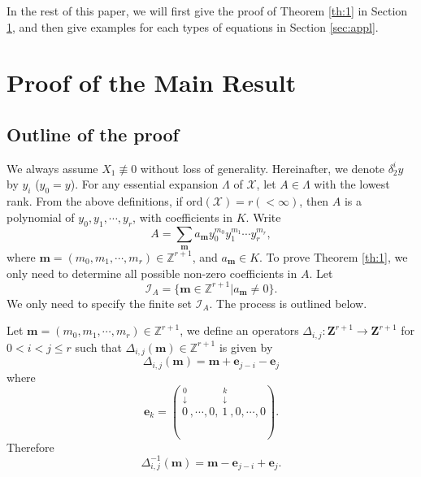 \documentclass[preprint,12pt]{elsarticle}
\begin{document}
In the rest of this paper, we will first give the proof of Theorem \ref{th:1} in Section \ref{sec:proof}, and then give examples for each types of equations in Section \ref{sec:appl}.

\section{Proof of  the Main Result}
\label{sec:proof}
\subsection{Outline of the proof}

We always assume $X_1 \not\equiv 0$ without loss of generality.  Hereinafter, we denote $\delta_2^i y$ by $y_i$ ($y_0 = y$). For any essential expansion $\Lambda$ of $\mathscr{X}$, let $A\in \Lambda$ with the lowest rank.  From the above definitions, if $\mathrm{ord}(\mathscr{X}) = r (< \infty)$, then $A$ is a polynomial of $y_0, y_1, \cdots, y_r$, with coefficients in $K$. Write
\begin{equation}
A = \sum_\mathbf{m} a_\mathbf{m} y_0^{m_0}y_1^{m_1}\cdots y_r^{m_r},
\end{equation}
where $\mathbf{m} = (m_0, m_1,\cdots, m_r)\in \mathbb{Z}^{r+1}$, and $a_\mathbf{m}\in K$.  To prove Theorem \ref{th:1}, we only need to determine all possible non-zero coefficients in $A$.  Let
\begin{equation}
\mathcal{I}_A = \{\mathbf{m}\in \mathbb{Z}^{r+1}| a_\mathbf{m}\not=0\}.
\end{equation}
We only need to specify the finite set $\mathcal{I}_A$. The process is outlined below.

Let $\mathbf{m} = (m_0, m_1, \cdots, m_r)\in \mathbb{Z}^{r+1}$, we define an operators $\Delta_{i,j}:\mathbf{Z}^{r+1}\to\mathbf{Z}^{r+1}$ for $0<i<j\leq r$ such that  $\Delta_{i,j}(\mathbf{m})\in\mathbb{Z}^{r+1}$ is given by
\begin{equation}
\Delta_{i,j}(\mathbf{m}) = \mathbf{m} + \mathbf{e}_{j-i}  - \mathbf{e}_j
\end{equation}
where
$$\mathbf{e}_{k} = (\stackrel{\begin{array}{c}0\\ \downarrow\end{array}}{0},\cdots, 0,\stackrel{\begin{array}{c}k\\ \downarrow\end{array}}{1},0,\cdots, 0).$$
Therefore
\begin{equation}
\Delta_{i,j}^{-1}(\mathbf{m}) = \mathbf{m} - \mathbf{e}_{j-i}  + \mathbf{e}_j.
\end{equation}
\end{document}
